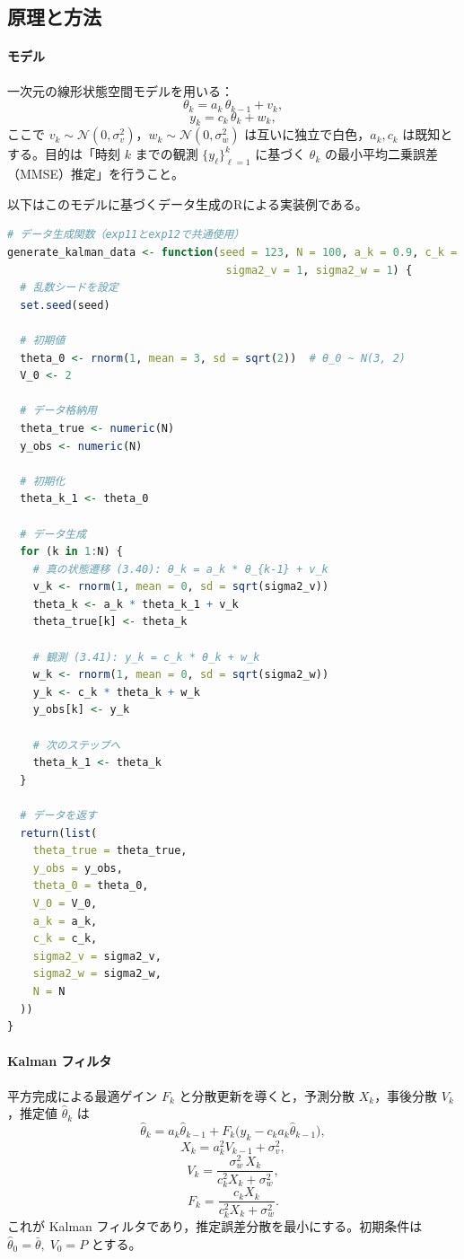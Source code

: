 \subsection{原理と方法}

\paragraph{モデル}
一次元の線形状態空間モデルを用いる：
\[
  \theta_k = a_k\,\theta_{k-1} + v_k,\tag{3.40}
\]
\[
  y_k = c_k\,\theta_k + w_k,\tag{3.41}
\]
ここで $v_k\sim\mathcal N(0,\sigma_v^2)$，$w_k\sim\mathcal N(0,\sigma_w^2)$ は互いに独立で白色，$a_k,c_k$ は既知とする\cite{exp2025}。目的は「時刻 $k$ までの観測 $\{y_\ell\}_{\ell=1}^k$ に基づく $\theta_k$ の最小平均二乗誤差（MMSE）推定」を行うこと\cite{exp2025}。

以下はこのモデルに基づくデータ生成のRによる実装例である。
\begin{lstlisting}[language=R,caption={データ生成関数}]
# データ生成関数（exp11とexp12で共通使用）
generate_kalman_data <- function(seed = 123, N = 100, a_k = 0.9, c_k = 2, 
                                  sigma2_v = 1, sigma2_w = 1) {
  # 乱数シードを設定
  set.seed(seed)
  
  # 初期値
  theta_0 <- rnorm(1, mean = 3, sd = sqrt(2))  # θ_0 ~ N(3, 2)
  V_0 <- 2
  
  # データ格納用
  theta_true <- numeric(N)
  y_obs <- numeric(N)
  
  # 初期化
  theta_k_1 <- theta_0
  
  # データ生成
  for (k in 1:N) {
    # 真の状態遷移 (3.40): θ_k = a_k * θ_{k-1} + v_k
    v_k <- rnorm(1, mean = 0, sd = sqrt(sigma2_v))
    theta_k <- a_k * theta_k_1 + v_k
    theta_true[k] <- theta_k
    
    # 観測 (3.41): y_k = c_k * θ_k + w_k
    w_k <- rnorm(1, mean = 0, sd = sqrt(sigma2_w))
    y_k <- c_k * theta_k + w_k
    y_obs[k] <- y_k
    
    # 次のステップへ
    theta_k_1 <- theta_k
  }
  
  # データを返す
  return(list(
    theta_true = theta_true,
    y_obs = y_obs,
    theta_0 = theta_0,
    V_0 = V_0,
    a_k = a_k,
    c_k = c_k,
    sigma2_v = sigma2_v,
    sigma2_w = sigma2_w,
    N = N
  ))
}
\end{lstlisting}

\paragraph{Kalman フィルタ}
平方完成による最適ゲイン $F_k$ と分散更新を導くと，予測分散 $X_k$，事後分散 $V_k$，推定値 $\hat\theta_k$ は
\[
\hat\theta_k = a_k\hat\theta_{k-1} + F_k\bigl(y_k - c_k a_k \hat\theta_{k-1}\bigr),\tag{3.36}
\]
\[
X_k = a_k^2 V_{k-1} + \sigma_v^2,\tag{3.37}
\]
\[
V_k = \frac{\sigma_w^2\, X_k}{c_k^2 X_k + \sigma_w^2},\tag{3.38}
\]
\[
F_k = \frac{c_k X_k}{c_k^2 X_k + \sigma_w^2}.\tag{3.39}
\]
これが Kalman フィルタであり，推定誤差分散を最小にする\cite{exp2025}。初期条件は $\hat\theta_0=\bar\theta,\;V_0=P$ とする\cite{exp2025}。

